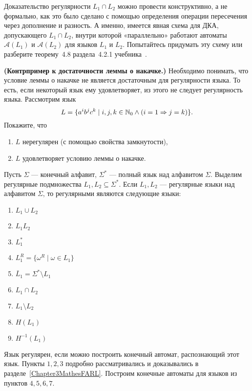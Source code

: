 \begin{myproblem}
Доказательство регулярности $L_1 \cap L_2$ можно провести
конструктивно, а не формально, как это было сделано с помощью
определения операции пересечения через дополнение и разность.
А именно, имеется явная схема для ДКА, допускающего $L_1 \cap L_2$,
внутри которой «параллельно» работают автоматы $\mathcal A(L_1)$
и $\mathcal A(L_2)$ для языков $L_1$ и $L_2$. Попытайтесь придумать эту
схему или разберите теорему~4.8 раздела~4.2.1 учебника~\cite{Hop}.
\end{myproblem}

\begin{myproblem}
\textbf{(Контрпример к достаточности леммы о накачке.)}
Необходимо понимать, что условие леммы о накачке не является
достаточным для регулярности языка. То есть, если
некоторый язык ему удовлетворяет, из этого не следует
регулярность языка. Рассмотрим язык
\[L = \{a^i b^j c^k \mid i, j, k \in \mathbb N_0 \wedge (i=1 \Rightarrow j = k)\}.\]
Покажите, что
\begin{enumerate}
    \item $L$ нерегулярен (с помощью свойства замкнутости),
    \item $L$ удовлетворяет условию леммы о накачке.
\end{enumerate}
\end{myproblem}

Пусть $\Sigma$ --- конечный алфавит, $\Sigma^*$ --- полный язык над 
алфавитом $\Sigma$. Выделим регулярные подмножества $L_1, L_2 \subseteq 
\Sigma^*$. Если $L_1, L_2$ --- регулярные языки над алфавитом $\Sigma$, 
то регулярными являются следующие языки:
\begin{multicols}{3}
\begin{enumerate}
\item $L_1 \cup L_2$
\item $L_1 L_2$
\item $L_1^*$
\item $L_1^R = \{ \omega^R \mid \omega \in L_1 \}$
\item $\bar L_1 = \Sigma^* \setminus L_1$
\item $L_1 \cap L_2$
\item $L_1 \setminus L_2$
\item $H(L_1)$
\item $H^{-1}(L_1)$
\end{enumerate}
\end{multicols}

Язык регулярен, если можно построить конечный автомат, распознающий 
этот язык. Пункты $1, 2, 3$ подробно рассматривались и доказывались в 
разделе~\ref{Chapter3MathesFARL}. Построим конечные автоматы для языков 
из пунктов $4, 5, 6, 7$.

